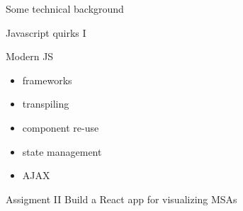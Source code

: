 \documentclass[10pt]{beamer}
\begin{document}
\begin{frame}{Some technical background}

\end{frame}

\begin{frame}{Javascript quirks I}
\end{frame}

\begin{frame}{Modern JS}
    \begin{itemize}
        \item frameworks
        \item transpiling
        \item component re-use
        \item state management
        \item AJAX
    \end{itemize}
\end{frame}

\begin{frame}{Assigment II}
    Build a React app for visualizing MSAs
\end{frame}
\end{document}

